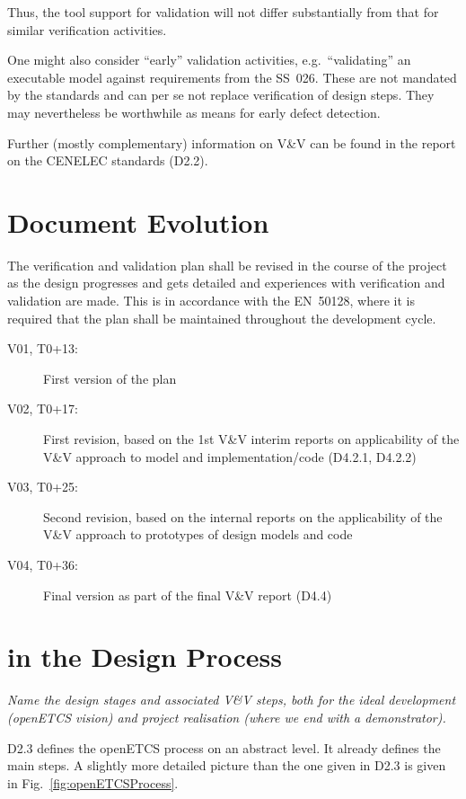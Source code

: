 \documentclass{template/openetcs_report}
\begin{document}
Thus, the tool support for validation will not differ substantially
from that for similar verification activities.

One might also consider ``early'' validation activities, e.g.\
``validating'' an executable model against requirements from the
SS~026. These are not mandated by the standards and can per se not
replace  verification of design steps. They may nevertheless be worthwhile
as means for early defect detection.

Further (mostly complementary) information on V\&V can be found in the
report on the CENELEC standards (D2.2).

\chapter{Document Evolution}

The verification and validation plan shall be revised in the course of
the project as the design progresses and gets detailed and experiences
with verification and validation are made. This is in accordance with
the EN~50128, where it is required that the plan shall be maintained
throughout the development cycle.

\begin{description}
\item[V01, T0+13:] First version of the plan
\item[V02, T0+17:] First revision, based on the 1st V\&V interim
  reports on applicability of the V\&V approach to model and
  implementation/code (D4.2.1, D4.2.2)
\item[V03, T0+25:] Second revision, based on the internal reports on
  the applicability of the V\&V approach to prototypes of design
  models and code
\item[V04, T0+36:] Final version as part of the final V\&V report (D4.4) 
\end{description}

\chapter{\VV in the Design Process}
\label{cha:vv-design-process}

\textit{Name the design stages and associated V\&V steps, both for the
ideal development (openETCS vision) and project realisation (where we
end with a demonstrator).}

D2.3 defines the openETCS process on an abstract level. It already
defines the main steps. A slightly more detailed picture than the one
given in D2.3 is given in Fig.~\ref{fig:openETCSProcess}. 
\end{document}
